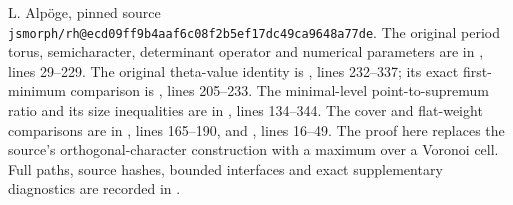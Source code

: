 L. Alp\"oge, pinned source
\texttt{jsmorph/rh@ecd09ff9b4aaf6c08f2b5ef17dc49ca9648a77de}.
The original period torus, semicharacter, determinant operator
and numerical parameters are in
, lines 29--229.
The original theta-value identity is
,
lines 232--337; its exact first-minimum comparison is
, lines 205--233.
The minimal-level point-to-supremum ratio and its size inequalities
are in , lines 134--344.
The cover and flat-weight comparisons are in
,
lines 165--190, and
,
lines 16--49.  The proof here replaces the source's
orthogonal-character construction with a maximum over a Voronoi
cell.  Full paths, source hashes, bounded interfaces and exact
supplementary diagnostics are recorded in
.
